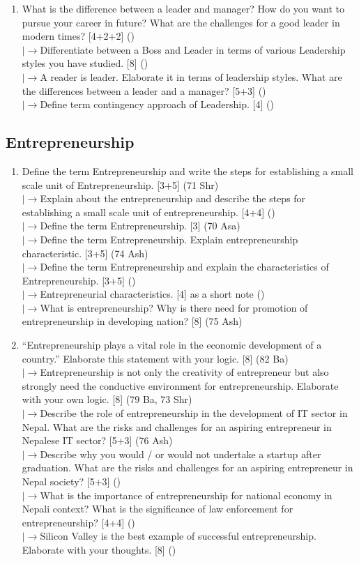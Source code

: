 \documentclass[12pt]{article}
\newcommand{\lb}{\\$\left|\rightarrow\right.$}
\begin{document}
\begin{enumerate}[topsep=0pt, noitemsep]
      \item What is the difference between a leader and manager? How do you want to pursue your career in future? What are the challenges for a good leader in modern times? \hfill [4+2+2] ()
        \lb Differentiate between a Boss and Leader in terms of various Leadership styles you have studied. \hfill [8] ()
        \lb A reader is leader. Elaborate it in terms of leadership styles. What are the differences between a leader and a manager? \hfill [5+3] ()
        \lb Define term contingency approach of Leadership. \hfill [4] ()
    \end{enumerate}

  \subsection{Entrepreneurship}
    \begin{enumerate}[topsep=0pt, noitemsep]
      \item Define the term Entrepreneurship and write the steps for establishing a small scale unit of Entrepreneurship. \hfill [3+5] (71 Shr)
        \lb Explain about the entrepreneurship and describe the steps for establishing a small scale unit of entrepreneurship. \hfill [4+4] ()
        \lb Define the term Entrepreneurship. \hfill [3] (70 Asa)
        \lb Define the term Entrepreneurship. Explain entrepreneurship characteristic. \hfill [3+5] (74 Ash)
        \lb Define the term Entrepreneurship and explain the characteristics of Entrepreneurship. \hfill [3+5] ()
        \lb Entrepreneurial characteristics. \hfill [4] as a short note ()
        \lb What is entrepreneurship? Why is there need for promotion of entrepreneurship in developing nation? \hfill [8] (75 Ash)

      \item ``Entrepreneurship plays a vital role in the economic development of a country.'' Elaborate this statement with your logic. \hfill [8] (82 Ba)
        \lb Entrepreneurship is not only the creativity of entrepreneur but also strongly need the conductive environment for entrepreneurship. Elaborate with your own logic. \hfill [8] (79 Ba, 73 Shr)
        \lb Describe the role of entrepreneurship in the development of IT sector in Nepal. What are the risks and challenges for an aspiring entrepreneur in Nepalese IT sector? \hfill [5+3] (76 Ash)
        \lb Describe why you would / or would not undertake a startup after graduation. What are the risks and challenges for an aspiring entrepreneur in Nepal society? \hfill [5+3] ()
        \lb What is the importance of entrepreneurship for national economy in Nepali context? What is the significance of law enforcement for entrepreneurship? \hfill [4+4] ()
        \lb Silicon Valley is the best example of successful entrepreneurship. Elaborate with your thoughts. \hfill [8] ()
    \end{enumerate}
\end{document}
